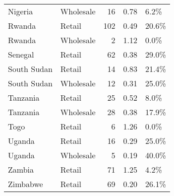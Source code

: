 \begin{table}[ht]
\begin{tabular}{llrrl}
  Nigeria & Wholesale &  16 & 0.78 & 6.2\% \\ 
  Rwanda & Retail & 102 & 0.49 & 20.6\% \\ 
  Rwanda & Wholesale &   2 & 1.12 & 0.0\% \\ 
  Senegal & Retail &  62 & 0.38 & 29.0\% \\ 
  South Sudan & Retail &  14 & 0.83 & 21.4\% \\ 
  South Sudan & Wholesale &  12 & 0.31 & 25.0\% \\ 
  Tanzania & Retail &  25 & 0.52 & 8.0\% \\ 
  Tanzania & Wholesale &  28 & 0.38 & 17.9\% \\ 
  Togo & Retail &   6 & 1.26 & 0.0\% \\ 
  Uganda & Retail &  16 & 0.29 & 25.0\% \\ 
  Uganda & Wholesale &   5 & 0.19 & 40.0\% \\ 
  Zambia & Retail &  71 & 1.25 & 4.2\% \\ 
  Zimbabwe & Retail &  69 & 0.20 & 26.1\% \\ 
   \hline
\end{tabular}
\end{table}
